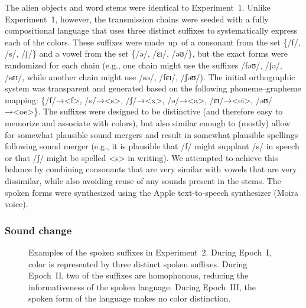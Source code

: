 \documentclass[doc,biblatex]{apa7}
\begin{document}
The alien objects and word stems were identical to Experiment~1. Unlike Experiment~1, however, the transmission chains were seeded with a fully compositional language that uses three distinct suffixes to systematically express each of the colors. These suffixes were made~up~of a consonant from the set \{/f/, /s/, /ʃ/\} and a vowel from the set \{/ə/, /ɛɪ/, /əʊ/\}, but the exact forms were randomized for each chain (e.g., one chain might use the suffixes /fəʊ/, /ʃə/, /sɛɪ/, while another chain might use /sə/, /fɛɪ/, /ʃəʊ/). The initial orthographic system was transparent and generated based on the following phoneme–grapheme mapping: \{/f/→<f>, /s/→<s>, /ʃ/→<x>, /ə/→<a>, /ɛɪ/→<ei>, /əʊ/→<oe>\}. The suffixes were designed to be distinctive (and therefore easy to memorize and associate with colors), but also similar enough to (mostly) allow for somewhat plausible sound mergers and result in somewhat plausible spellings following sound merger (e.g., it is plausible that /f/ might supplant /s/ in speech or that /ʃ/ might be spelled <s> in writing). We attempted to achieve this balance by combining consonants that are very similar with vowels that are very dissimilar, while also avoiding reuse of any sounds present in the stems. The spoken forms were synthesized using the Apple text-to-speech synthesizer (Moira voice).

\subsubsection{Sound change}

	\begin{figure}
	\vspace*{2pt}
	\caption{Examples of the spoken suffixes in Experiment~2. During Epoch~I, color is represented by three distinct spoken suffixes. During Epoch~II, two of the suffixes are homophonous, reducing the informativeness of the spoken language. During Epoch~III, the spoken form of the language makes no color distinction.}
	\label{sound_change}
	\end{figure}
\end{document}
